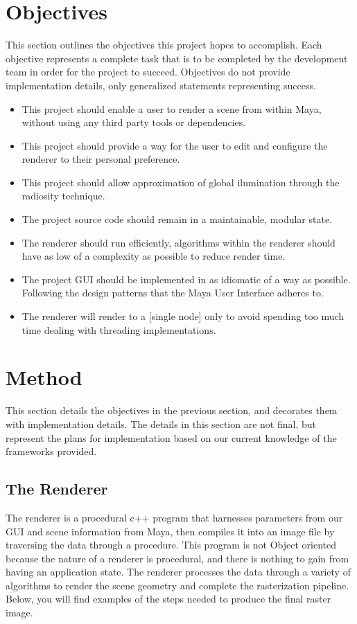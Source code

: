 \documentclass{report}
\begin{document}
\chapter{Objectives}
This section outlines the objectives this project hopes to accomplish. Each
objective represents a complete task that is to be completed by the development
team in order for the project to succeed. Objectives do not provide
implementation details, only generalized statements representing success.
\begin{itemize}
\item This project should enable a user to render a scene from within Maya, without using any third party tools or dependencies.
\item This project should provide a way for the user to edit and configure the renderer to their personal preference.
\item This project should allow approximation of global ilumination through the radiosity technique.
\item The project source code should remain in a maintainable, modular state.
\item The renderer should run efficiently, algorithms within the renderer should have as low of a complexity as possible to reduce render time.
\item The project GUI should be implemented in as idiomatic of a way as possible. Following the design patterns that the Maya User Interface adheres to.
\item The renderer will render to a [single node] only to avoid spending too much time dealing with threading implementations.
\end{itemize}
\chapter{Method}
This section details the objectives in the previous section, and decorates them
with implementation details. The details in this section are not final, but
represent the plans for implementation based on our current knowledge of the
frameworks provided.

\section{The Renderer}
The renderer is a procedural c++ program that harnesses parameters from our GUI
and scene information from Maya, then compiles it into an image file by
traversing the data through a procedure. This program is not Object oriented
because the nature of a renderer is procedural, and there is nothing to gain
from having an application state. The renderer processes the data through
a variety of algorithms to render the scene geometry and complete the
rasterization pipeline. Below, you will find examples of the steps needed to
produce the final raster image.
\end{document}
